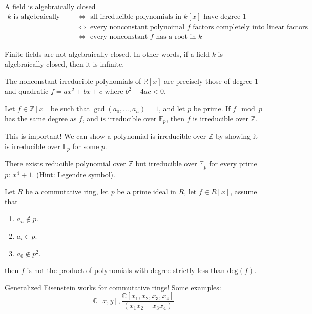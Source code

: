 \documentclass[openany]{book}
\newcommand{\R}{\mathbb{R}}
\newcommand{\Z}{\mathbb{Z}}
\newcommand{\C}{\mathbb{C}}
\newcommand{\F}{\mathbb{F}}
\begin{document}
\begin{prop}
    A field is algebraically closed 
    \begin{align*}
        k \text{ is algebraically closed}&\iff \text{ all irreducible polynomials in $k[x]$ have degree $1$}\\
        &\iff \text{ every nonconstant polynoimal $f$ factors completely into linear factors}\\
        &\iff \text{ every nonconstant $f$ has a root in $k$}
    \end{align*}
\end{prop}

\begin{prop}
    Finite fields are not algebraically closed. In other words, if a field $k$ is algebraically closed, then it is infinite.
\end{prop}

\begin{example}
    The nonconstant irreducible polynomials of $\R[x]$ are precisely those of degree $1$ and quadratic $f=ax^2+bx+c$ where $b^2-4ac<0$.
\end{example}


\begin{prop}
    Let $f\in\Z[x]$ be such that $\gcd(a_0,\dots,a_n)=1$, and let $p$ be prime. If $f\mod p$ has the same degree as $f$, and is irreducible over $\F_p$, then $f$ is irreducible over $\Z$.
\end{prop}
\begin{warn}
    This is important! We can show a polynomial is irreducible over $\Z$ by showing it is irreducible over $\F_p$ for some $p$.
\end{warn}

\begin{example}
    There exists reducible polynomial over $\Z$ but irreducible over $\F_p$ for every prime $p$: $x^4+1$. (Hint: Legendre symbol).
\end{example}

\begin{prop}
    Let $R$ be a commutative ring, let $p$ be a prime ideal in $R$, let $f\in R[x]$, assume that 
    \begin{enumerate}
        \item $a_n\not\in p$.
        \item $a_i\in p$.
        \item $a_0\not\in p^2$.
    \end{enumerate}
    then $f$ is not the product of polynomials with degree strictly less than $\text{deg}(f)$.
\end{prop}
\begin{warn}
    Generalized Eisenstein works for commutative rings! Some examples:
    \begin{equation*}
        \C[x,y], \frac{\C[x_1,x_2,x_3,x_4]}{(x_1x_2-x_3x_4)}
    \end{equation*}
\end{warn}
\end{document}
